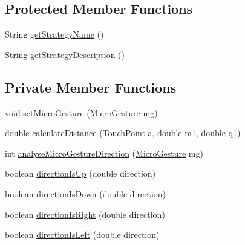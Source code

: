 \subsection*{Protected Member Functions}
\begin{DoxyCompactItemize}
\item 
String \hyperlink{classch_1_1zhaw_1_1ba10__bsha__1_1_1strategies_1_1MicroGestureDetectionStrategyCurvature_acd5003f685af87709425848adde5bc0f}{getStrategyName} ()
\item 
String \hyperlink{classch_1_1zhaw_1_1ba10__bsha__1_1_1strategies_1_1MicroGestureDetectionStrategyCurvature_a78946977e95404053d40384e51b889e2}{getStrategyDescription} ()
\end{DoxyCompactItemize}
\subsection*{Private Member Functions}
\begin{DoxyCompactItemize}
\item 
void \hyperlink{classch_1_1zhaw_1_1ba10__bsha__1_1_1strategies_1_1MicroGestureDetectionStrategyCurvature_a8e53337041e648e2e5f9c72cc74d7a0e}{setMicroGesture} (\hyperlink{classch_1_1zhaw_1_1ba10__bsha__1_1_1service_1_1MicroGesture}{MicroGesture} mg)
\item 
double \hyperlink{classch_1_1zhaw_1_1ba10__bsha__1_1_1strategies_1_1MicroGestureDetectionStrategyCurvature_aa729634754fd1d0e1d5c4f0c5b403500}{calculateDistance} (\hyperlink{classch_1_1zhaw_1_1ba10__bsha__1_1_1TouchPoint}{TouchPoint} a, double m1, double q1)
\item 
int \hyperlink{classch_1_1zhaw_1_1ba10__bsha__1_1_1strategies_1_1MicroGestureDetectionStrategyCurvature_a8290d90ed16b0c2e0a14ab7de9cb1493}{analyseMicroGestureDirection} (\hyperlink{classch_1_1zhaw_1_1ba10__bsha__1_1_1service_1_1MicroGesture}{MicroGesture} mg)
\item 
boolean \hyperlink{classch_1_1zhaw_1_1ba10__bsha__1_1_1strategies_1_1MicroGestureDetectionStrategyCurvature_acabafe95c89e97cd87488d70ed074adb}{directionIsUp} (double direction)
\item 
boolean \hyperlink{classch_1_1zhaw_1_1ba10__bsha__1_1_1strategies_1_1MicroGestureDetectionStrategyCurvature_a1c4ae8dcc40fa0809afcbc701a5afa65}{directionIsDown} (double direction)
\item 
boolean \hyperlink{classch_1_1zhaw_1_1ba10__bsha__1_1_1strategies_1_1MicroGestureDetectionStrategyCurvature_a0e5c080758fc29ddf572ed02f9c749ae}{directionIsRight} (double direction)
\item 
boolean \hyperlink{classch_1_1zhaw_1_1ba10__bsha__1_1_1strategies_1_1MicroGestureDetectionStrategyCurvature_aab6c8ffaec46c10a9d15786b95654afd}{directionIsLeft} (double direction)
\end{DoxyCompactItemize}


